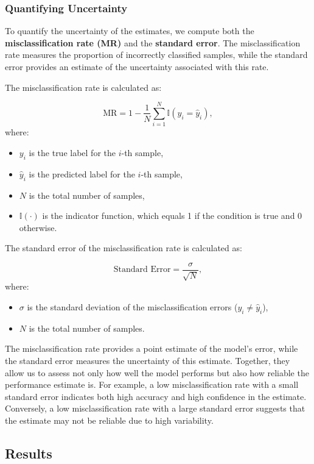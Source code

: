 \documentclass[fleqn,moreauthors,10pt]{ds_report}
\begin{document}
\subsubsection*{Quantifying Uncertainty}


To quantify the uncertainty of the estimates, we compute both the \textbf{misclassification rate (MR)} and the \textbf{standard error}. The misclassification rate measures the proportion of incorrectly classified samples\cite{MLPP}, while the standard error provides an estimate of the uncertainty associated with this rate.

The misclassification rate is calculated as:

\[
\text{MR} = 1 - \frac{1}{N} \sum_{i=1}^{N} \mathbb{I}(y_i = \hat{y}_i),
\]
where:
\begin{itemize}
    \item \( y_i \) is the true label for the \( i \)-th sample,
    \item \( \hat{y}_i \) is the predicted label for the \( i \)-th sample,
    \item \( N \) is the total number of samples,
    \item \( \mathbb{I}(\cdot) \) is the indicator function, which equals 1 if the condition is true and 0 otherwise.
\end{itemize}

The standard error of the misclassification rate is calculated as:

\[
\text{Standard Error} = \frac{\sigma}{\sqrt{N}},
\]
where:
\begin{itemize}
    \item \( \sigma \) is the standard deviation of the misclassification errors (\( y_i \neq \hat{y}_i \)),
    \item \( N \) is the total number of samples.
\end{itemize}


The misclassification rate provides a point estimate of the model's error, while the standard error measures the uncertainty of this estimate. Together, they allow us to assess not only how well the model performs but also how reliable the performance estimate is. For example, a low misclassification rate with a small standard error indicates both high accuracy and high confidence in the estimate. Conversely, a low misclassification rate with a large standard error suggests that the estimate may not be reliable due to high variability.


\subsection*{Results}
\end{document}
